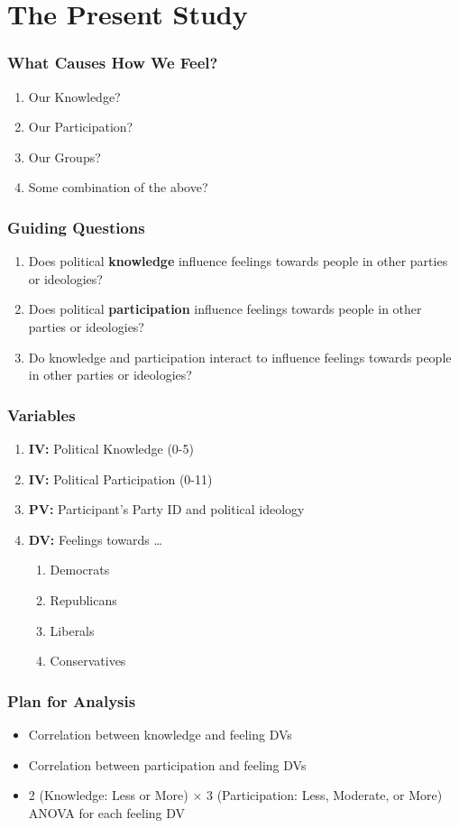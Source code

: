 \documentclass[14pt]{beamer}
\newcommand\tb{\textbf}
\begin{document}
\section{The Present Study}

\begin{frame}
\frametitle{What Causes How We Feel?}
\begin{enumerate}
	\item Our Knowledge?
	\item Our Participation?
	\item Our Groups?
	\item Some combination of the above?
\end{enumerate}
\end{frame}

\begin{frame}
\frametitle{Guiding Questions}
\begin{enumerate}
	\item Does political \tb{knowledge} influence feelings towards people in other parties or ideologies?
	\item Does political \tb{participation} influence feelings towards people in other parties or ideologies?
	\item Do knowledge and participation interact to influence feelings towards people in other parties or ideologies?
\end{enumerate}
\end{frame}

\begin{frame}
\frametitle{Variables}
\begin{enumerate}
	\item \tb{IV:} Political Knowledge (0-5)
	\item \tb{IV:} Political Participation (0-11)
	\item \tb{PV:} Participant's Party ID and political ideology
	\item \tb{DV:} Feelings towards \ldots
	\begin{enumerate}
		\item Democrats
		\item Republicans
		\item Liberals
		\item Conservatives
	\end{enumerate}
\end{enumerate}
\end{frame}

\begin{frame}
\frametitle{Plan for Analysis}
\begin{itemize}
	\item Correlation between knowledge and feeling DVs
	\item Correlation between participation and feeling DVs
	\item 2 (Knowledge: Less or More) $\times$ 3 (Participation: Less, Moderate, or More) ANOVA for each feeling DV
\end{itemize}
\end{frame}
\end{document}
